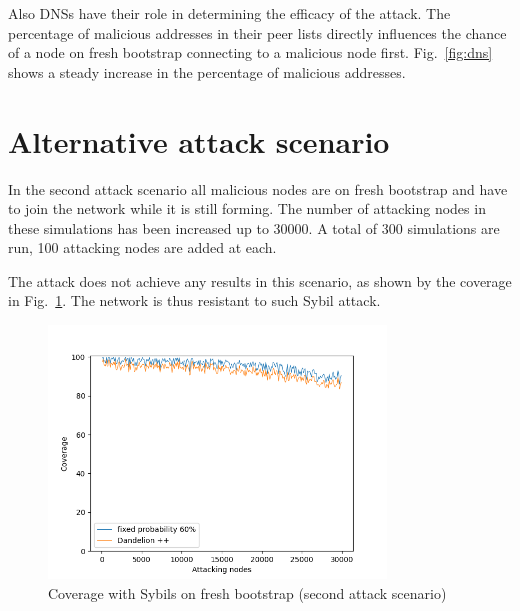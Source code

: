 Also DNSs have their role in determining the efficacy of the attack. The percentage of malicious addresses in their peer lists directly influences the chance of a node on fresh bootstrap connecting to a malicious node first. Fig.~\ref{fig:dns} shows a steady increase in the percentage of malicious addresses.

\section{Alternative attack scenario}\label{sec:external}
In the second attack scenario all malicious nodes are on fresh bootstrap and have to join the network while it is still forming. The number of attacking nodes in these simulations has been increased up to 30000. A total of 300 simulations are run, 100 attacking nodes are added at each.\par

The attack does not achieve any results in this scenario, as shown by the coverage in Fig.~\ref{fig:ext-cov}. The network is thus resistant to such Sybil attack.\par

\begin{figure}[h!]
            \includegraphics[width=0.8\textwidth]{pict/results/ext-cov.png}
			\centering
			\caption{Coverage with Sybils on fresh bootstrap (second attack scenario)}
			\label{fig:ext-cov}
\end{figure}

